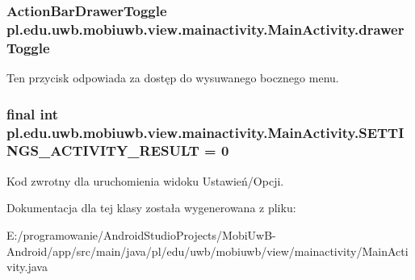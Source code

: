 \subsubsection[{drawer\+Toggle}]{\setlength{\rightskip}{0pt plus 5cm}Action\+Bar\+Drawer\+Toggle pl.\+edu.\+uwb.\+mobiuwb.\+view.\+mainactivity.\+Main\+Activity.\+drawer\+Toggle}\label{classpl_1_1edu_1_1uwb_1_1mobiuwb_1_1view_1_1mainactivity_1_1_main_activity_adcd865523f4722f51418797af0fd9b7e}
Ten przycisk odpowiada za dostęp do wysuwanego bocznego menu. \hypertarget{classpl_1_1edu_1_1uwb_1_1mobiuwb_1_1view_1_1mainactivity_1_1_main_activity_a270c6f59eb4d28ac2dd4dec0e6264333}{}
\subsubsection[{S\+E\+T\+T\+I\+N\+G\+S\+\_\+\+A\+C\+T\+I\+V\+I\+T\+Y\+\_\+\+R\+E\+S\+U\+L\+T}]{\setlength{\rightskip}{0pt plus 5cm}final int pl.\+edu.\+uwb.\+mobiuwb.\+view.\+mainactivity.\+Main\+Activity.\+S\+E\+T\+T\+I\+N\+G\+S\+\_\+\+A\+C\+T\+I\+V\+I\+T\+Y\+\_\+\+R\+E\+S\+U\+L\+T = 0\hspace{0.3cm}{\ttfamily [static]}}\label{classpl_1_1edu_1_1uwb_1_1mobiuwb_1_1view_1_1mainactivity_1_1_main_activity_a270c6f59eb4d28ac2dd4dec0e6264333}
Kod zwrotny dla uruchomienia widoku Ustawień/\+Opcji. 

Dokumentacja dla tej klasy została wygenerowana z pliku\+:\begin{DoxyCompactItemize}
\item 
E\+:/programowanie/\+Android\+Studio\+Projects/\+Mobi\+Uw\+B-\/\+Android/app/src/main/java/pl/edu/uwb/mobiuwb/view/mainactivity/Main\+Activity.\+java\end{DoxyCompactItemize}
